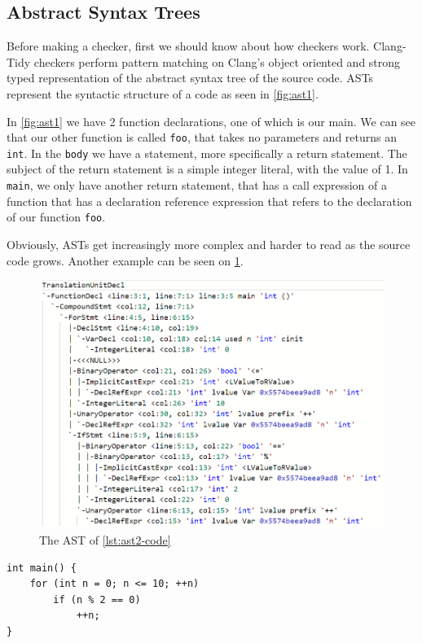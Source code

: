 \subsection{Abstract Syntax Trees}

Before making a checker, first we should know about how checkers work. Clang-Tidy checkers perform pattern matching on
Clang's object oriented and strong typed representation of the abstract syntax tree of the source code.
ASTs represent the syntactic structure of a code as seen in \cref{fig:ast1}.

In \cref{fig:ast1} we have 2 function declarations, one of which is our main. We can see that our other function is called \texttt{foo},
that takes no parameters and returns an \texttt{int}. In the \texttt{body} we have a statement, more specifically a
return statement. The subject of the return statement is a simple integer literal, with the value of 1.
In \texttt{main}, we only have another return statement, that has a call expression of a function that has a
declaration reference expression that refers to the declaration of our function \texttt{foo}.

Obviously, ASTs get increasingly more complex and harder to read as the source code grows. Another example can be seen on \cref{fig:ast2}.
\begin{figure}[H]
    \includegraphics[width=\linewidth]{images/random_ast2.png}
	\caption{The AST of \cref{lst:ast2-code}}
    \label{fig:ast2}
\end{figure}

\begin{listing}[H]
  \begin{verbatim}
int main() {
	for (int n = 0; n <= 10; ++n)
		if (n % 2 == 0)
			++n;
}
\end{verbatim}
\caption{The code of \cref{fig:ast2}.}\label{lst:ast2-code}
\end{listing}

